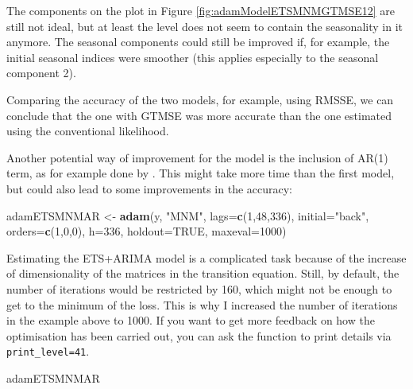 \documentclass[]{book}
\newenvironment{Shaded}{\begin{snugshade}}{\end{snugshade}}
\newcommand{\DataTypeTok}[1]{\textcolor[rgb]{0.13,0.29,0.53}{#1}}
\newcommand{\DecValTok}[1]{\textcolor[rgb]{0.00,0.00,0.81}{#1}}
\newcommand{\KeywordTok}[1]{\textcolor[rgb]{0.13,0.29,0.53}{\textbf{#1}}}
\newcommand{\NormalTok}[1]{#1}
\newcommand{\OtherTok}[1]{\textcolor[rgb]{0.56,0.35,0.01}{#1}}
\newcommand{\StringTok}[1]{\textcolor[rgb]{0.31,0.60,0.02}{#1}}
\theoremstyle{definition}
\theoremstyle{definition}
\theoremstyle{definition}
\theoremstyle{definition}
\theoremstyle{remark}
\begin{document}
The components on the plot in Figure \ref{fig:adamModelETSMNMGTMSE12} are still not ideal, but at least the level does not seem to contain the seasonality in it anymore. The seasonal components could still be improved if, for example, the initial seasonal indices were smoother (this applies especially to the seasonal component 2).

Comparing the accuracy of the two models, for example, using RMSSE, we can conclude that the one with GTMSE was more accurate than the one estimated using the conventional likelihood.

Another potential way of improvement for the model is the inclusion of AR(1) term, as for example done by \citet{Taylor2010}. This might take more time than the first model, but could also lead to some improvements in the accuracy:

\begin{Shaded}
\begin{Highlighting}[]
\NormalTok{adamETSMNMAR <-}\StringTok{ }\KeywordTok{adam}\NormalTok{(y, }\StringTok{"MNM"}\NormalTok{, }\DataTypeTok{lags=}\KeywordTok{c}\NormalTok{(}\DecValTok{1}\NormalTok{,}\DecValTok{48}\NormalTok{,}\DecValTok{336}\NormalTok{),}
                     \DataTypeTok{initial=}\StringTok{"back"}\NormalTok{, }\DataTypeTok{orders=}\KeywordTok{c}\NormalTok{(}\DecValTok{1}\NormalTok{,}\DecValTok{0}\NormalTok{,}\DecValTok{0}\NormalTok{),}
                     \DataTypeTok{h=}\DecValTok{336}\NormalTok{, }\DataTypeTok{holdout=}\OtherTok{TRUE}\NormalTok{, }\DataTypeTok{maxeval=}\DecValTok{1000}\NormalTok{)}
\end{Highlighting}
\end{Shaded}

Estimating the ETS+ARIMA model is a complicated task because of the increase of dimensionality of the matrices in the transition equation. Still, by default, the number of iterations would be restricted by 160, which might not be enough to get to the minimum of the loss. This is why I increased the number of iterations in the example above to 1000. If you want to get more feedback on how the optimisation has been carried out, you can ask the function to print details via \texttt{print\_level=41}.

\begin{Shaded}
\begin{Highlighting}[]
\NormalTok{adamETSMNMAR}
\end{Highlighting}
\end{Shaded}
\end{document}
